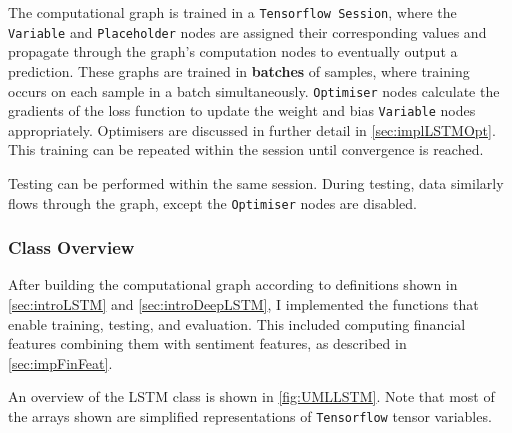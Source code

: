 \documentclass[12pt,a4paper,twoside,openright]{report}
\begin{document}
The computational graph is trained in a \texttt{Tensorflow Session},
where the \texttt{Variable} and \texttt{Placeholder} nodes are assigned their
corresponding values
and propagate through the graph's computation nodes to eventually
output a prediction. These
graphs are trained in \textbf{batches} of samples, where training occurs
on each sample in a batch simultaneously. \texttt{Optimiser} nodes
calculate the gradients of the loss function to update the weight
and bias \texttt{Variable} nodes appropriately.
Optimisers are discussed in further detail in \cref{sec:implLSTMOpt}.
This training can be repeated within the session until convergence
is reached.

Testing can be performed within the same session. During testing,
data similarly flows through the graph, except the \texttt{Optimiser} nodes are disabled.

\subsubsection{Class Overview}

After building the computational graph according to definitions
shown in \cref{sec:introLSTM} and \cref{sec:introDeepLSTM}, I implemented the functions
that enable training, testing, and evaluation. This included computing
financial features combining them with sentiment features, as described in \cref{sec:impFinFeat}.

An overview of the LSTM class is shown in \cref{fig:UMLLSTM}. Note that most of the
arrays shown are simplified representations of \texttt{Tensorflow} tensor
variables.
\end{document}
